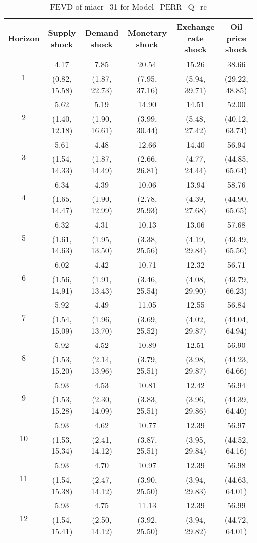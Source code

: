\documentclass{article}
\begin{document}
\begin{table}
	\footnotesize
	\caption{FEVD of miacr_31 for Model_PERR_Q_rc}
	\begin{tabular}{cccccc}
		Horizon & Supply shock & Demand shock & Monetary shock & Exchange rate shock & Oil price shock\\ \hline
		\multirow{2}{*}{1} & 4.17 & 7.85 & 20.54 & 15.26 & 38.66\\
		 & (0.82, 15.58) & (1.87, 22.73) & (7.95, 37.16) & (5.94, 39.71) & (29.22, 48.85)\\
		\multirow{2}{*}{2} & 5.62 & 5.19 & 14.90 & 14.51 & 52.00\\
		 & (1.40, 12.18) & (1.90, 16.61) & (3.99, 30.44) & (5.48, 27.42) & (40.12, 63.74)\\
		\multirow{2}{*}{3} & 5.61 & 4.48 & 12.66 & 14.40 & 56.94\\
		 & (1.54, 14.33) & (1.87, 14.49) & (2.66, 26.81) & (4.77, 24.44) & (44.85, 65.64)\\
		\multirow{2}{*}{4} & 6.34 & 4.39 & 10.06 & 13.94 & 58.76\\
		 & (1.65, 14.47) & (1.90, 12.99) & (2.78, 25.93) & (4.39, 27.68) & (44.90, 65.65)\\
		\multirow{2}{*}{5} & 6.32 & 4.31 & 10.13 & 13.06 & 57.68\\
		 & (1.61, 14.63) & (1.95, 13.50) & (3.38, 25.56) & (4.19, 29.84) & (43.49, 65.56)\\
		\multirow{2}{*}{6} & 6.02 & 4.42 & 10.71 & 12.32 & 56.71\\
		 & (1.56, 14.91) & (1.91, 13.43) & (3.46, 25.54) & (4.08, 29.90) & (43.79, 66.23)\\
		\multirow{2}{*}{7} & 5.92 & 4.49 & 11.05 & 12.55 & 56.84\\
		 & (1.54, 15.09) & (1.96, 13.70) & (3.69, 25.52) & (4.02, 29.87) & (44.04, 64.94)\\
		\multirow{2}{*}{8} & 5.92 & 4.52 & 10.89 & 12.51 & 56.90\\
		 & (1.53, 15.20) & (2.14, 13.96) & (3.79, 25.51) & (3.98, 29.87) & (44.23, 64.66)\\
		\multirow{2}{*}{9} & 5.93 & 4.53 & 10.81 & 12.42 & 56.94\\
		 & (1.53, 15.28) & (2.30, 14.09) & (3.83, 25.51) & (3.96, 29.86) & (44.39, 64.40)\\
		\multirow{2}{*}{10} & 5.93 & 4.62 & 10.77 & 12.39 & 56.97\\
		 & (1.53, 15.34) & (2.41, 14.12) & (3.87, 25.51) & (3.95, 29.84) & (44.52, 64.16)\\
		\multirow{2}{*}{11} & 5.93 & 4.70 & 10.97 & 12.39 & 56.98\\
		 & (1.54, 15.38) & (2.47, 14.12) & (3.90, 25.50) & (3.94, 29.83) & (44.63, 64.01)\\
		\multirow{2}{*}{12} & 5.93 & 4.75 & 11.13 & 12.39 & 56.99\\
		 & (1.54, 15.41) & (2.50, 14.12) & (3.92, 25.50) & (3.94, 29.82) & (44.72, 64.01)\\
	\end{tabular}
\label{tab:fevd-Model_PERR_Q_rc-miacr_31}
\end{table}
\end{document}
